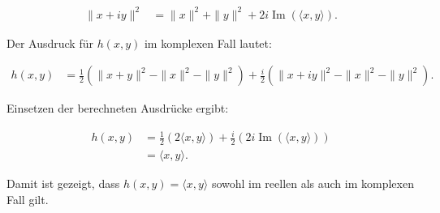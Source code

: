 \begin{align*}
\|x+iy\|^2 &= \|x\|^2 + \|y\|^2 + 2i \operatorname{Im}(\langle x, y \rangle).
\end{align*}

Der Ausdruck für $h(x, y)$ im komplexen Fall lautet:

\begin{align*}
h(x, y) &= \frac{1}{2}(\|x+y\|^2 - \|x\|^2 - \|y\|^2) + \frac{i}{2}(\|x+iy\|^2 - \|x\|^2 - \|y\|^2).
\end{align*}

Einsetzen der berechneten Ausdrücke ergibt:

\begin{align*}
h(x, y) &= \frac{1}{2}(2 \langle x, y \rangle) + \frac{i}{2}(2i \operatorname{Im}(\langle x, y \rangle)) \\
&= \langle x, y \rangle.
\end{align*}

Damit ist gezeigt, dass $h(x, y) = \langle x, y \rangle$ sowohl im reellen als auch im komplexen Fall gilt.

